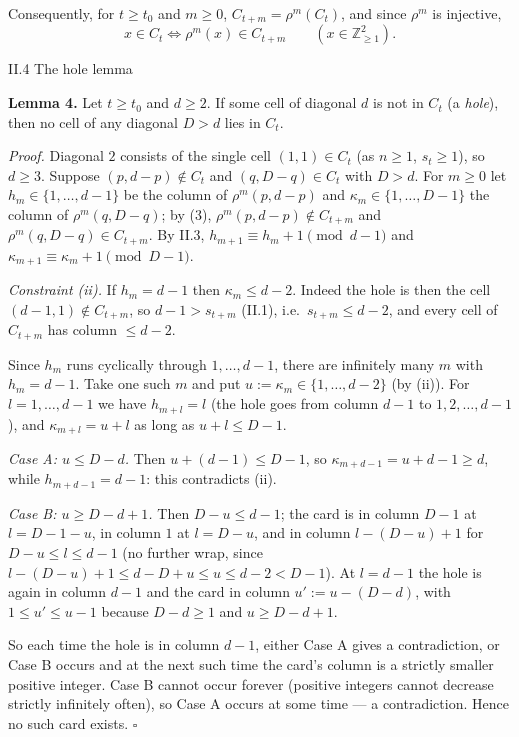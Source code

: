 \documentclass[11pt,a4paper]{article}
\begin{document}
Consequently, for \(t\ge t_0\) and \(m\ge0\), \(C_{t+m}=\rho^m(C_t)\),
and since \(\rho^m\) is injective,
\[x\in C_t\iff\rho^m(x)\in C_{t+m}\qquad(x\in\mathbb Z_{\ge1}^2). \tag{3}\]

II.4 The hole lemma

\textbf{Lemma 4.} Let \(t\ge t_0\) and \(d\ge2\). If some cell of
diagonal \(d\) is not in \(C_t\) (a \emph{hole}), then no cell of any
diagonal \(D>d\) lies in \(C_t\).

\emph{Proof.} Diagonal \(2\) consists of the single cell
\((1,1)\in C_t\) (as \(n\ge1\), \(s_t\ge1\)), so \(d\ge3\). Suppose
\((p,d-p)\notin C_t\) and \((q,D-q)\in C_t\) with \(D>d\). For \(m\ge0\)
let \(h_m\in\{1,\dots,d-1\}\) be the column of \(\rho^m(p,d-p)\) and
\(\kappa_m\in\{1,\dots,D-1\}\) the column of \(\rho^m(q,D-q)\); by (3),
\(\rho^m(p,d-p)\notin C_{t+m}\) and \(\rho^m(q,D-q)\in C_{t+m}\). By
II.3, \(h_{m+1}\equiv h_m+1\pmod{d-1}\) and
\(\kappa_{m+1}\equiv\kappa_m+1\pmod{D-1}\).

\emph{Constraint (ii).} If \(h_m=d-1\) then \(\kappa_m\le d-2\). Indeed
the hole is then the cell \((d-1,1)\notin C_{t+m}\), so \(d-1>s_{t+m}\)
(II.1), i.e.~\(s_{t+m}\le d-2\), and every cell of \(C_{t+m}\) has
column \(\le d-2\).

Since \(h_m\) runs cyclically through \(1,\dots,d-1\), there are
infinitely many \(m\) with \(h_m=d-1\). Take one such \(m\) and put
\(u:=\kappa_m\in\{1,\dots,d-2\}\) (by (ii)). For \(l=1,\dots,d-1\) we
have \(h_{m+l}=l\) (the hole goes from column \(d-1\) to
\(1,2,\dots,d-1\)), and \(\kappa_{m+l}=u+l\) as long as \(u+l\le D-1\).

\emph{Case A: \(u\le D-d\).} Then \(u+(d-1)\le D-1\), so
\(\kappa_{m+d-1}=u+d-1\ge d\), while \(h_{m+d-1}=d-1\): this contradicts
(ii).

\emph{Case B: \(u\ge D-d+1\).} Then \(D-u\le d-1\); the card is in
column \(D-1\) at \(l=D-1-u\), in column \(1\) at \(l=D-u\), and in
column \(l-(D-u)+1\) for \(D-u\le l\le d-1\) (no further wrap, since
\(l-(D-u)+1\le d-D+u\le u\le d-2<D-1\)). At \(l=d-1\) the hole is again
in column \(d-1\) and the card in column \(u':=u-(D-d)\), with
\(1\le u'\le u-1\) because \(D-d\ge1\) and \(u\ge D-d+1\).

So each time the hole is in column \(d-1\), either Case A gives a
contradiction, or Case B occurs and at the next such time the card's
column is a strictly smaller positive integer. Case B cannot occur
forever (positive integers cannot decrease strictly infinitely often),
so Case A occurs at some time --- a contradiction. Hence no such card
exists. \(\square\)
\end{document}
